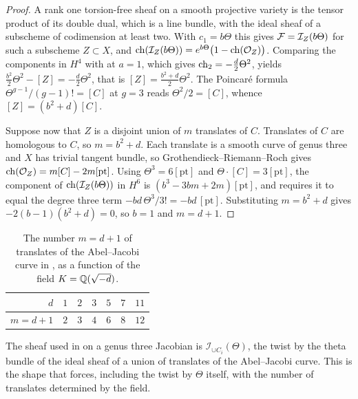 \begin{proof}
A rank one torsion-free sheaf on a smooth projective variety is the tensor
product of its double dual, which is a line bundle, with the ideal sheaf of a
subscheme of codimension at least two. With $c_{1}=b\Theta$ this gives
$\mathcal{F}=\mathcal{I}_{Z}(b\Theta)$ for such a subscheme $Z\subset X$, and
$\operatorname{ch}(\mathcal{I}_{Z}(b\Theta))=e^{b\Theta}\bigl(1-\operatorname{ch}(\mathcal{O}_{Z})\bigr)$.
Comparing the components in $H^{4}$ with  at $a=1$,
which gives $\operatorname{ch}_{2}=-\tfrac{d}{2}\Theta^{2}$, yields
$\tfrac{b^{2}}{2}\Theta^{2}-[Z]=-\tfrac{d}{2}\Theta^{2}$, that is
$[Z]=\tfrac{b^{2}+d}{2}\Theta^{2}$. The Poincar\'e formula
$\Theta^{g-1}/(g-1)!=[C]$ at $g=3$ reads $\Theta^{2}/2=[C]$, whence
$[Z]=(b^{2}+d)[C]$.

Suppose now that $Z$ is a disjoint union of $m$ translates of $C$. Translates
of $C$ are homologous to $C$, so $m=b^{2}+d$. Each translate is a smooth curve
of genus three and $X$ has trivial tangent bundle, so Grothendieck--Riemann--Roch
gives $\operatorname{ch}(\mathcal{O}_{Z})=m[C]-2m[\mathrm{pt}]$. Using $\Theta^{3}=6[\mathrm{pt}]$
and $\Theta\cdot[C]=3[\mathrm{pt}]$, the component of
$\operatorname{ch}(\mathcal{I}_{Z}(b\Theta))$ in $H^{6}$ is
$(b^{3}-3bm+2m)[\mathrm{pt}]$, and  requires it to
equal the degree three term $-bd\,\Theta^{3}/3!=-bd\,[\mathrm{pt}]$.
Substituting $m=b^{2}+d$ gives $-2(b-1)(b^{2}+d)=0$, so $b=1$ and $m=d+1$.
\end{proof}

\begin{table}[htbp]
\centering
\renewcommand{\arraystretch}{1.15}
\begin{tabular}{@{}rrrrrrr@{}}
\toprule
$d$ & $1$ & $2$ & $3$ & $5$ & $7$ & $11$ \\
\midrule
$m=d+1$ & $2$ & $3$ & $4$ & $6$ & $8$ & $12$ \\
\bottomrule
\end{tabular}
\caption{The number $m=d+1$ of translates of the Abel--Jacobi curve in
, as a function of the field $K=\mathbb{Q}(\sqrt{-d})$.}
\label{tab:translates}
\end{table}

\begin{remark}\label{rem:markmancheck}
The sheaf used in \cite{Mar25b} on a genus three Jacobian is
$\mathcal{I}_{\cup C_{i}}(\Theta)$, the twist by the theta bundle of the ideal
sheaf of a union of translates of the Abel--Jacobi curve. This is the shape
that  forces, including the twist by $\Theta$ itself, with
the number of translates determined by the field.
\end{remark}

